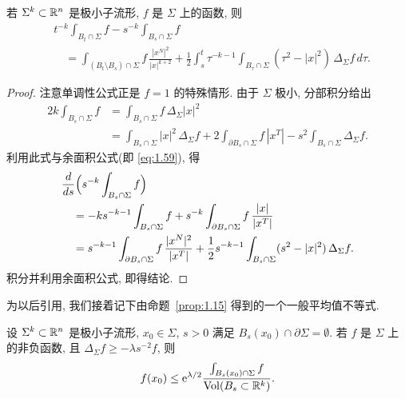 \begin{proposition}[平均值不等式]
\label{prop:1.15}
若 $\Sigma^k\subset\mathbb{R}^n$ 是极小子流形, $f$ 是 $\Sigma$ 上的函数, 则
\begin{equation}
\begin{aligned}
&t^{-k}\int_{B_t\cap\Sigma}f-s^{-k}\int_{B_s\cap\Sigma}f\\
&\quad=\int_{(B_t\setminus B_s)\cap\Sigma}f\,
 \frac{|x^{N}|^{2}}{|x|^{k+2}}
 +\frac12\int_s^t\tau^{-k-1}\int_{B_\tau\cap\Sigma}
 (\tau^2-|x|^2)\,\Delta_{\Sigma}f\,d\tau.
\end{aligned}
\label{eq:1.73}
\end{equation}
\end{proposition}

\begin{proof}
注意单调性公式正是 $f=1$ 的特殊情形. 由于 $\Sigma$ 极小, 分部积分给出
\begin{equation}
\begin{aligned}
2k\int_{B_s\cap\Sigma}f
&=\int_{B_s\cap\Sigma}f\,\Delta_{\Sigma}|x|^2\\
&=\int_{B_s\cap\Sigma}|x|^2\,\Delta_{\Sigma}f
 +2\int_{\partial B_s\cap\Sigma}f\,|x^{T}|
 -s^2\int_{B_s\cap\Sigma}\Delta_{\Sigma}f.
\end{aligned}
\label{eq:1.74}
\end{equation}
利用此式与余面积公式(即 \eqref{eq:1.59}), 得
\begin{equation}
\begin{aligned}
&\frac{d}{ds}\Bigl(s^{-k}\int_{B_s\cap\Sigma}f\Bigr)\\
&\quad=-ks^{-k-1}\int_{B_s\cap\Sigma}f
 +s^{-k}\int_{\partial B_s\cap\Sigma}f\,\frac{|x|}{|x^{T}|}\\
&\quad=s^{-k-1}\int_{\partial B_s\cap\Sigma}f\,
 \frac{|x^{N}|^{2}}{|x^{T}|}
 +\frac12s^{-k-1}\int_{B_s\cap\Sigma}
 (s^2-|x|^2)\,\Delta_{\Sigma}f.
\end{aligned}
\label{eq:1.75}
\end{equation}
积分并利用余面积公式, 即得结论.
\end{proof}

为以后引用, 我们接着记下由命题~\ref{prop:1.15} 得到的一个一般平均值不等式.

\begin{corollary}
\label{cor:1.16}
设 $\Sigma^k\subset\mathbb{R}^n$ 是极小子流形, $x_0\in\Sigma$, $s>0$ 满足
$B_s(x_0)\cap\partial\Sigma=\emptyset$. 若 $f$ 是 $\Sigma$ 上的非负函数, 且
$\Delta_{\Sigma}f\geq-\lambda s^{-2}f$, 则
\begin{equation}
f(x_0)\leq\mathrm{e}^{\lambda/2}
 \frac{\int_{B_s(x_0)\cap\Sigma}f}{\operatorname{Vol}(B_s\subset\mathbb{R}^k)}.
\label{eq:1.76}
\end{equation}
\end{corollary}

